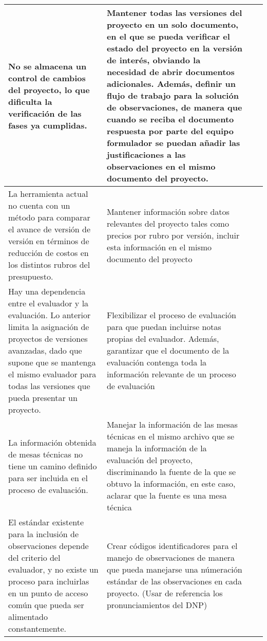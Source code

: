 \documentclass{article}
\begin{document}
\begin{landscape}
\begin{longtable}{ |p{12cm}|p{8cm}|p{2cm}|p{2cm}|}
No se almacena un control de cambios del proyecto, lo que dificulta la verificación de las fases ya cumplidas. & Mantener todas las versiones del proyecto en un solo documento, en el que se pueda verificar el estado del proyecto en la versión de interés, obviando la necesidad de abrir documentos adicionales. Además, definir un flujo de trabajo para la solución de observaciones, de manera que cuando se reciba el documento respuesta por parte del equipo formulador se puedan añadir las justificaciones a las observaciones en el mismo documento del proyecto. & & \\\hline

La herramienta actual no cuenta con un método para comparar el avance de versión de versión en términos de reducción de costos en los distintos rubros del presupuesto. & Mantener información sobre datos relevantes del proyecto tales como precios por rubro por versión, incluir esta información en el mismo documento del proyecto & & \\\hline

Hay una dependencia entre el evaluador y la evaluación. Lo anterior limita la asignación de proyectos de versiones avanzadas, dado que supone que se mantenga el mismo evaluador para todas las versiones que pueda presentar un proyecto. & Flexibilizar el proceso de evaluación para que puedan incluirse notas propias del evaluador. Además, garantizar que el documento de la evaluación contenga toda la información relevante de un proceso de evaluación & & \\\hline

La información obtenida de mesas técnicas no tiene un camino definido para ser incluida en el proceso de evaluación. & Manejar la información de las mesas técnicas en el mismo archivo que se maneja la información de la evaluación del proyecto, discriminando la fuente de la que se obtuvo la información, en este caso, aclarar que la fuente es una mesa técnica & & \\\hline

El estándar existente para la inclusión de observaciones depende del criterio del evaluador, y no existe un proceso para incluirlas en un punto de acceso común que pueda ser alimentado constantemente. & Crear códigos identificadores para el manejo de observaciones de manera que pueda manejarse una númeración estándar de las observaciones en cada proyecto. (Usar de referencia los pronunciamientos del DNP)& & \\\hline


\end{longtable}
\end{landscape}
\end{document}
